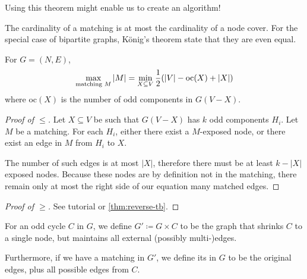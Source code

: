 Using this theorem might enable us to create an algorithm!
\begin{recall}
    The cardinality of a matching is at most the cardinality of a node cover.
    For the special case of bipartite graphs, König's theorem state that they are even equal.
\end{recall}
\begin{theorem}\label{thm:tutte-berge}
    For $G=(N,E)$,
    \begin{align*}
        \max_{\text{matching } M}|M|= \min_{X \subseteq V} \frac{1}{2}(|V|-\text{oc}(X)+|X|)
    \end{align*}
    where oc$(X)$ is the number of  odd components in $G(V-X)$.
\end{theorem}
\begin{proof}[Proof of $\leq$]
    Let $X \subseteq V$ be such that $G(V-X)$ has $k$ odd components $H_i$.
    Let $M$ be a matching. For each $H_i$, either there exist a $M$-exposed node,
    or there exist an edge in $M$ from $H_i$ to $X$.

    The number of such edges is at most $|X|$, therefore there must be at least $k - |X|$ exposed nodes.
    Because these nodes are by definition not in the matching, there remain only at most
    the right side of our equation many matched edges.
\end{proof}
\begin{proof}[Proof of $\geq$]
    See tutorial or \autoref{thm:reverse-tb}.
\end{proof}
\begin{definition}
    For an odd cycle $C$ in $G$, we define $G' \coloneqq G \times C$ to be the graph
    that shrinks $C$ to a single node, but maintains all external (possibly multi-)edges.

    Furthermore, if we have a matching in $G'$, we define its  in $G$
    to be the original edges, plus all possible edges from $C$.
\end{definition}

